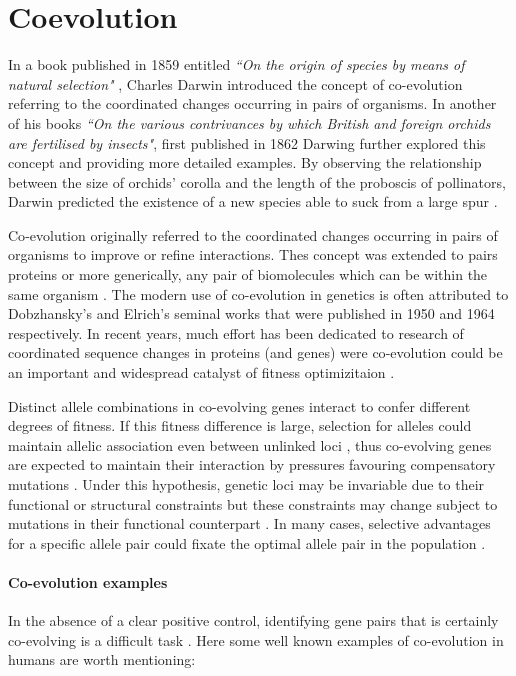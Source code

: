 \section{Coevolution}

In a book published in 1859 entitled \textit{``On the origin of species by means of natural selection"} \cite{darwin1859origin}, Charles Darwin introduced the concept of co-evolution referring to the coordinated changes occurring in pairs of organisms.
In another of his books \textit{``On the various contrivances by which British and foreign orchids are fertilised by insects"}, first published in 1862  \cite{darwin1877various} Darwing further explored this concept and providing more detailed examples.
By observing the relationship between the size of orchids' corolla and the length of the proboscis of pollinators, Darwin predicted the existence of a new species able to suck from a large spur \cite{de2013emerging}.

Co‐evolution originally referred to the coordinated changes occurring in pairs of organisms to improve or refine interactions.
Thes concept was extended to pairs proteins or more generically, any pair of biomolecules which can be within the same organism \cite{de2013emerging}.
The modern use of co-evolution in genetics is often attributed to Dobzhansky's \cite{dobzhansky1950genetics} and Elrich's \cite{ehrlich1964butterflies} seminal works that were published in 1950 and 1964 respectively.
In recent years, much effort has been dedicated to research of coordinated sequence changes in proteins (and genes) were co‐evolution could be an important and widespread catalyst of fitness optimizitaion \cite{de2013emerging}.

Distinct allele combinations in co-evolving genes interact to confer different degrees of fitness. 
If this fitness difference is large, selection for alleles could maintain allelic association even between unlinked loci \cite{rohlfs2010detecting}, thus co-evolving genes are expected to maintain their interaction by pressures favouring compensatory mutations \cite{rohlfs2010detecting}.
Under this hypothesis, genetic loci may be invariable due to their functional or structural constraints but these constraints may change subject to mutations in their functional counterpart \cite{fares2006novel}.
In many cases, selective advantages for a specific allele pair could fixate the optimal allele pair in the population \cite{rohlfs2010detecting}.

\paragraph{Co-evolution examples}
In the absence of a clear positive control, identifying gene pairs that is certainly co-evolving is a difficult task \cite{rohlfs2010detecting}.
Here some well known examples of co-evolution in humans are worth mentioning:

